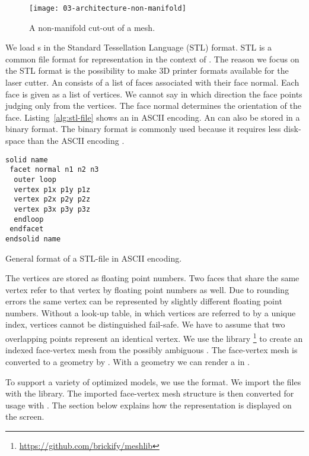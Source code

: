 \documentclass[../../ClassicThesis.tex]{subfiles}
\begin{document}
\begin{figure}[h]
  \centering
  \texttt{[image: 03-architecture-non-manifold]}
  \caption{A non-manifold cut-out of a mesh.}
  \label{fig:non-manifold}
\end{figure}

We load {\threedmodel}s in the Standard Tessellation
Language (STL) format. STL is a common file format for
{\threedmodel} representation in the context of
{\threedprinting}. The reason we focus on the STL format is
the possibility to make 3D printer formats available for the
laser cutter. An {\stlfile} consists of a list of faces
associated with their face normal. Each face is given as a
list of vertices. We cannot say in which direction the face
points judging only from the vertices. The face normal
determines the orientation of the face.
Listing~\ref{alg:stl-file} shows an {\stlfile} in ASCII
encoding. An {\stlfile} can also be stored in a binary
format. The binary format is commonly used because it
requires less disk-space than the ASCII encoding
\cite[p.~8]{stl-file}.

\begin{listing}
\begin{verbatim}
solid name
 facet normal n1 n2 n3
  outer loop
  vertex p1x p1y p1z
  vertex p2x p2y p2z
  vertex p3x p3y p3z
  endloop
 endfacet
endsolid name
\end{verbatim}
\caption{General format of a STL-file in ASCII encoding.}
\label{alg:stl-file}
\end{listing}

The vertices are stored as floating point numbers. Two faces
that share the same vertex refer to that vertex by
floating point numbers as well. Due to rounding errors the
same vertex can be represented by slightly different
floating point numbers. Without a look-up table, in which
vertices are referred to by a unique index, vertices cannot
be distinguished fail-safe. We have to assume that two
overlapping points represent an identical vertex. We use the
library
{\meshlib}\footnote{\url{https://github.com/brickify/meshlib}}
to create an indexed face-vertex mesh from the possibly
ambiguous {\stlfile}. The face-vertex mesh is converted to a
{\threejs} geometry by {\meshlib}. With a {\threejs}
geometry we can render a {\threedmodel} in {\convertify}.

To support a variety of {\threedprinter} optimized models,
we use the {\stlfile} format. We import the files with the
{\meshlib} library. The imported face-vertex mesh structure
is then converted for usage with {\threejs}. The section
below explains how the {\threejs} representation is
displayed on the screen.
\end{document}
